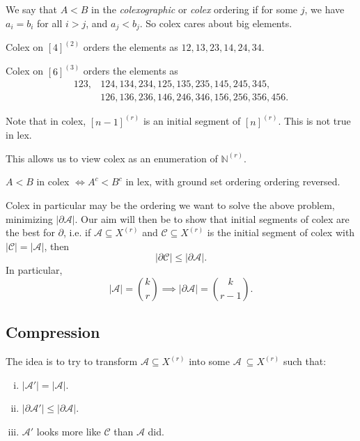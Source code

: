 \documentclass[12pt]{article}
\begin{document}
We say that $A < B$ in the \emph{colexographic} or \emph{colex} ordering if for some $j$, we have $a_i = b_i$ for all $i > j$, and $a_j < b_j$. So colex cares about big elements.


\begin{exbox}
	Colex on $[4]^{(2)}$ orders the elements as $12, 13, 23, 14, 24, 34$.

	Colex on $[6]^{(3)}$ orders the elements as
	\begin{align*}
		123, &124, 134, 234, 125, 135, 235, 145, 245, 345, \\
		     &126, 136, 236, 146, 246, 346, 156, 256, 356, 456.
	\end{align*}
\end{exbox}

Note that in colex, $[n-1]^{(r)}$ is an initial segment of $[n]^{(r)}$. This is not true in lex.

This allows us to view colex as an enumeration of $\mathbb{N}^{(r)}$.

\begin{remark}
	$A < B$ in colex $\iff A^c < B^c$ in lex, with ground set ordering ordering reversed.
\end{remark}

Colex in particular may be the ordering we want to solve the above problem, minimizing $|\partial \mathcal{A}|$. Our aim will then be to show that initial segments of colex are the best for $\partial$, i.e. if $\mathcal{A} \subseteq X^{(r)}$ and $\mathcal{C} \subseteq X^{(r)}$ is the initial segment of colex with $|\mathcal{C}| = |\mathcal{A}|$, then
\[
|\partial \mathcal{C}| \leq |\partial \mathcal{A}|.
\]
In particular,
\[
	|\mathcal{A}| = \binom kr \implies |\partial \mathcal{A}| = \binom k{r-1}.
\]
\subsection{Compression}%
\label{sub:comp}

The idea is to try to transform $\mathcal{A} \subseteq X^{(r)}$ into some $\mathcal{A}\ \subseteq X^{(r)}$ such that:
\begin{enumerate}[(i)]
	\item $|\mathcal{A}'| = |\mathcal{A}|$.
	\item $|\partial \mathcal{A}'| \leq |\partial \mathcal{A}|$.
	\item $\mathcal{A}'$ looks more like $\mathcal{C}$ than $\mathcal{A}$ did.
\end{enumerate}
\end{document}
